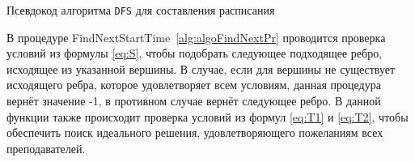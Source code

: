 \begin{algorithm} 
	\nonl{}
	\caption{Псевдокод алгоритма \texttt{DFS} для составления расписания}\label{alg:algoFindSol}
\end{algorithm} 

В процедуре FindNextStartTime~\ref{alg:algoFindNextPr} проводится проверка условий из формулы \eqref{eq:S}, чтобы подобрать следующее подходящее ребро, исходящее из указанной вершины. В случае, если для вершины не существует исходящего ребра, которое удовлетворяет всем условиям, данная процедура вернёт значение -1, в противном случае вернёт следующее ребро. В данной функции также происходит проверка условий из формул \eqref{eq:T1} и \eqref{eq:T2}, чтобы обеспечить поиск идеального решения, удовлетворяющего пожеланиям всех преподавателей. 


